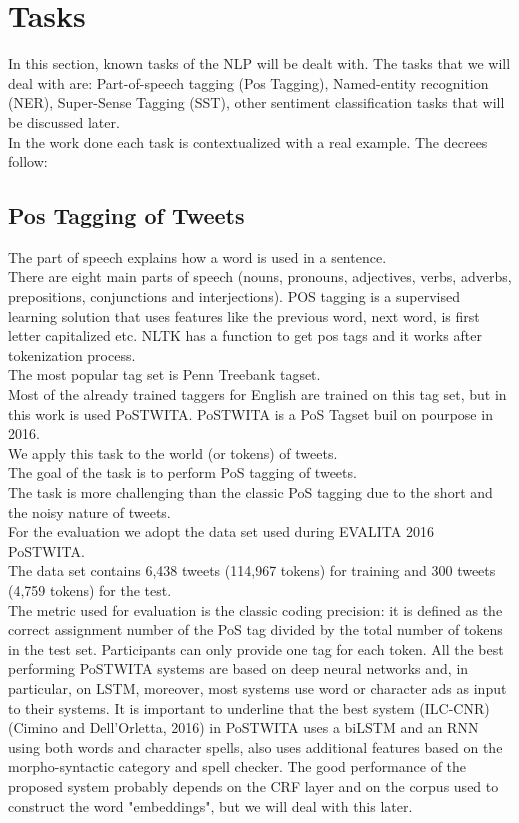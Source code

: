 \documentclass[twocolumn,10pt]{wmrDoc}
\begin{document}
\section{Tasks}

In this section, known tasks of the NLP will be dealt with.
The tasks that we will deal with are: Part-of-speech tagging (Pos Tagging), Named-entity recognition (NER), Super-Sense Tagging (SST), other sentiment classification tasks that will be discussed later.\\
In the work done each task is contextualized with a real example. The decrees follow:

\subsection{Pos Tagging of Tweets}

The part of speech explains how a word is used in a sentence.\\
There are eight main parts of speech (nouns, pronouns, adjectives, verbs, adverbs, prepositions, conjunctions and interjections).
POS tagging is a supervised learning solution that uses features like the previous word, next word, is first letter capitalized etc. NLTK has a function to get pos tags and it works after tokenization process.\\
The most popular tag set is Penn Treebank tagset.\\
Most of the already trained taggers for English are trained on this tag set, but in this work is used PoSTWITA. PoSTWITA is a PoS Tagset buil on pourpose in 2016.\\
We apply this task to the world (or tokens) of tweets.\\
The goal of the task is to perform PoS tagging of tweets.\\
The task is more challenging than the classic PoS tagging due to the short and the noisy nature of tweets.\\
For the evaluation we adopt the data set used during EVALITA 2016 PoSTWITA.\\
The data set contains 6,438 tweets (114,967 tokens) for training and 300 tweets (4,759 tokens) for the test.\\
The metric used for evaluation is the classic coding precision: it is defined as the correct assignment number of the PoS tag divided by the total number of tokens in the test set. Participants can only provide one tag for each token. All the best performing PoSTWITA systems are based on deep neural networks and, in particular, on LSTM, moreover, most systems use word or character ads as input to their systems.
It is important to underline that the best system (ILC-CNR) \cite{DBLP:conf/clic-it/CiminoD16}(Cimino and Dell'Orletta, 2016) in PoSTWITA uses a biLSTM and an RNN using
both words and character spells, also uses additional features based on the morpho-syntactic category and spell checker. The good performance of the proposed system probably depends on the CRF layer and on the corpus used to construct the word "embeddings", but we will deal with this later.
\end{document}
